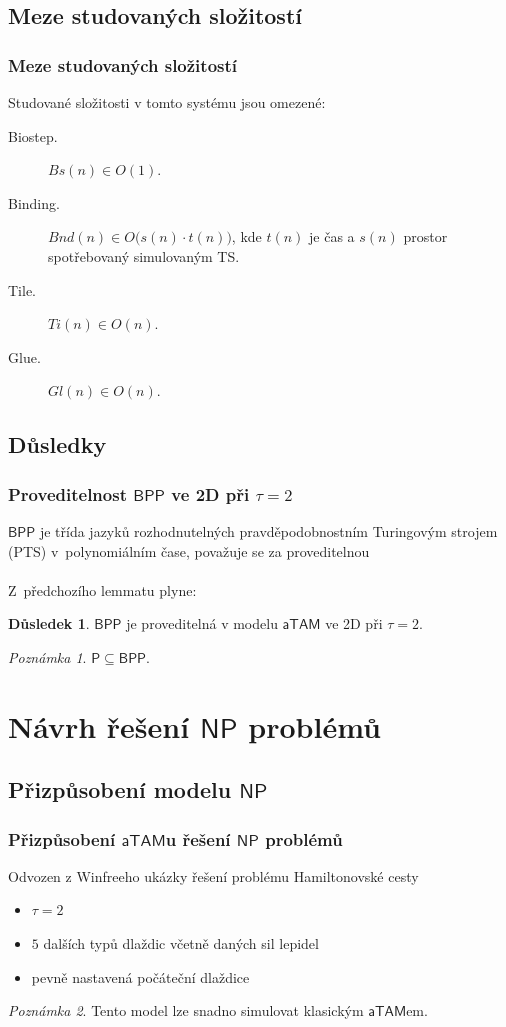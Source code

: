 \documentclass[10pt]{beamer}
\renewcommand{\P}{\mathsf{P}}
\newcommand{\NP}{\mathsf{NP}}
\newcommand{\BPP}{\mathsf{BPP}}
\newcommand{\atam}{\mathsf{aTAM}}
\theoremstyle{definition}
\newtheorem{dusl}[tvr]{Důsledek}
\theoremstyle{remark}
\newtheorem{pozn}{Poznámka}
\begin{document}
\subsection{Meze studovaných složitostí}
\begin{frame}
\frametitle{Meze studovaných složitostí}
	\begin{lemma}
		Studované složitosti v tomto systému jsou omezené:
		\begin{description}
			\item[Biostep.] $Bs(n) \in O(1)$.
			\item[Binding.] $Bnd(n) \in O\bigl(s(n)\cdot t(n)\bigr)$, kde $t(n)$ je čas a $s(n)$ prostor spotřebovaný simulovaným TS.
			\item[Tile.] $Ti(n) \in O(n)$.
			\item[Glue.] $Gl(n) \in O(n)$.
		\end{description}
	\end{lemma}
\end{frame}

\subsection{Důsledky}
\begin{frame}
\frametitle{Proveditelnost $\BPP$ ve 2D při $\tau=2$}
	$\BPP$ je třída jazyků rozhodnutelných pravděpodobnostním Turingovým strojem (PTS) v~polynomiálním čase, považuje se za proveditelnou\\
	~\\
	Z~předchozího lemmatu plyne:
	\begin{dusl}
		$\BPP$ je proveditelná v modelu $\atam$ ve 2D při $\tau=2$.
	\end{dusl}
	\begin{pozn}
		$\P \subseteq \BPP$.
	\end{pozn}
\end{frame}

\section{Návrh řešení $\NP$ problémů}
\subsection{Přizpůsobení modelu $\NP$}
\begin{frame}
\frametitle{Přizpůsobení $\atam$u řešení $\NP$ problémů}
	Odvozen z Winfreeho ukázky řešení problému Hamiltonovské cesty
	\begin{itemize}
		\item $\tau=2$
		\item $5$ dalších typů dlaždic včetně daných sil lepidel
		\item pevně nastavená počáteční dlaždice
	\end{itemize}
	\begin{pozn}
		Tento model lze snadno simulovat klasickým $\atam$em.
	\end{pozn}
\end{frame}
\end{document}
